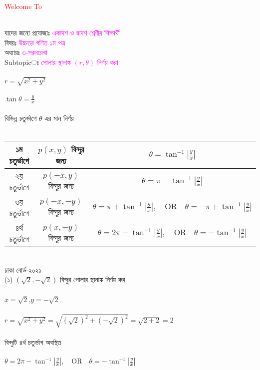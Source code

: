 \documentclass{article}
\begin{document}
 
	\Large
	\textcolor{red}{Welcome To} 
	\\
	\\
	যাদের জন্যে প্রযোজ্যঃ  	\textcolor{magenta}{একাদশ ও দ্বাদশ শ্রেণীর শিক্ষার্থী} \\
	বিষয়ঃ \textcolor{magenta}{উচ্চতর গণিত ১ম পত্র} \\
	অধ্যায়ঃ \textcolor{magenta}{৩-সরলরেখা}\\ 
	Subtopicঃ  \textcolor{magenta}{  পোলার স্থানাঙ্ক $(r,\theta)$ নির্ণয় করা }\\
	\\
	$r=\sqrt{x^2+y^2}$\\
	\\
	$\tan \theta =\frac{y}{x}$\\
	\\
	বিভিন্ন চতুর্ভাগে $\theta $ এর মান নির্ণয় \\
	\\ 
	\begin{tabular}{|c|c|c|}
		\hline
		১ম চতুর্ভাগে & $p(x,y)$ বিন্দুর জন্য & $\theta= \tan^{-1}|\frac{y}{x}|$\\
		\hline 
		২য় চতুর্ভাগে & $p(-x,y)$ বিন্দুর জন্য & $\theta= \pi - \tan^{-1}|\frac{y}{x}|$\\
		\hline
		৩য় চতুর্ভাগে & $p(-x,-y)$ বিন্দুর জন্য & $\theta= \pi+\tan^{-1}|\frac{y}{x}|,\quad \mbox{OR}\quad \theta= -\pi+\tan^{-1}|\frac{y}{x}| $\\
		\hline
		৪র্থ  চতুর্ভাগে & $p(x,-y)$ বিন্দুর জন্য & $\theta= 2\pi-\tan^{-1}|\frac{y}{x}|,\quad \mbox{OR}\quad \theta= -\tan^{-1}|\frac{y}{x}| $\\
		\hline
	\end{tabular}
	\\
	ঢাকা বোর্ড-২০২১\\
(১)	$(\sqrt{2},-\sqrt{2})$ বিন্দুর পোলার স্থানাঙ্ক নির্ণয় কর\\
	\\
	$x=\sqrt{2}$,\qquad  $y=-\sqrt{2}$\\
	\\
	$r=\sqrt{x^2+y^2}=\sqrt{(\sqrt{2})^2+(-\sqrt{2})^2}=\sqrt{2+2}=2$\\
	\\
	বিন্দুটি  ৪র্থ চতুর্ভাগ অবস্থিত\\
	\\
	$\theta= 2\pi-\tan^{-1}|\frac{y}{x}|,\quad \mbox{OR}\quad \theta= -\tan^{-1}|\frac{y}{x}| $\\
\end{document}
